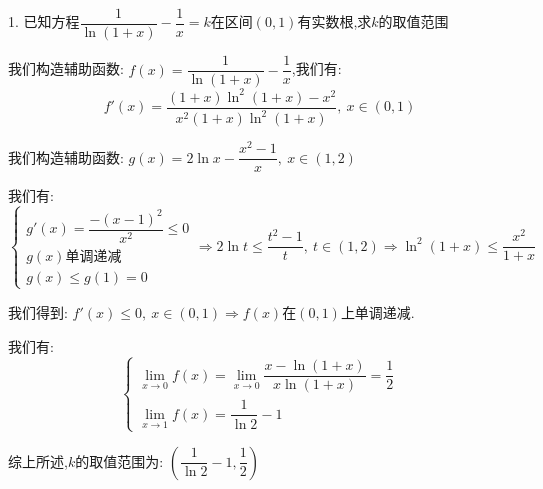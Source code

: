 1. 已知方程$\dfrac{1}{\ln(1+x)}-\dfrac{1}{x}=k$在区间$(0,1)$有实数根,求$k$的取值范围
\begin{solution}

	我们构造辅助函数:  $f(x)=\dfrac{1}{\ln(1+x)}-\dfrac{1}{x}$,我们有:  
	$$f'(x)=\dfrac{(1+x)\ln^2(1+x)-x^2}{x^2(1+x)\ln^2(1+x)},\ x\in(0,1)$$
	
	我们构造辅助函数:  $g(x)=2\ln x-\dfrac{x^2-1}{x},\ x\in(1,2)$
	
	我们有:  
	$$\left\lbrace
	\begin{array}{l}
		g'(x)=\dfrac{-(x-1)^2}{x^2}\leq 0\\
		g(x)\text{单调递减}\\
		g(x)\leq g(1)=0
	\end{array}
	\right. \Rightarrow 2\ln t\leq \dfrac{t^2-1}{t},\ t\in(1,2)\Rightarrow \ln^2(1+x)\leq \dfrac{x^2}{1+x}$$
	
	我们得到:  $f'(x)\leq 0,\ x\in(0,1)\Rightarrow f(x)$在$(0,1)$上单调递减.
	
	我们有:  $$\left\lbrace
	\begin{array}{l}
		\lim\limits_{x\rightarrow 0}f(x)=\lim\limits_{x\rightarrow 0}\dfrac{x-\ln(1+x)}{x\ln(1+x)}=\dfrac{1}{2}\\
		\lim\limits_{x\rightarrow 1}f(x)=\dfrac{1}{\ln 2}-1
	\end{array}
	\right. $$
	
	综上所述,$k$的取值范围为:  $(\dfrac{1}{\ln2}-1,\dfrac{1}{2})$
\end{solution}

